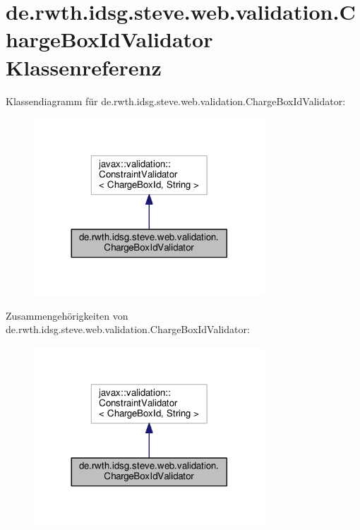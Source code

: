 \hypertarget{classde_1_1rwth_1_1idsg_1_1steve_1_1web_1_1validation_1_1_charge_box_id_validator}{\section{de.\+rwth.\+idsg.\+steve.\+web.\+validation.\+Charge\+Box\+Id\+Validator Klassenreferenz}
\label{classde_1_1rwth_1_1idsg_1_1steve_1_1web_1_1validation_1_1_charge_box_id_validator}
}


Klassendiagramm für de.\+rwth.\+idsg.\+steve.\+web.\+validation.\+Charge\+Box\+Id\+Validator\+:\nopagebreak
\begin{figure}[H]
\begin{center}
\leavevmode
\includegraphics[width=245pt]{classde_1_1rwth_1_1idsg_1_1steve_1_1web_1_1validation_1_1_charge_box_id_validator__inherit__graph}
\end{center}
\end{figure}


Zusammengehörigkeiten von de.\+rwth.\+idsg.\+steve.\+web.\+validation.\+Charge\+Box\+Id\+Validator\+:\nopagebreak
\begin{figure}[H]
\begin{center}
\leavevmode
\includegraphics[width=245pt]{classde_1_1rwth_1_1idsg_1_1steve_1_1web_1_1validation_1_1_charge_box_id_validator__coll__graph}
\end{center}
\end{figure}
